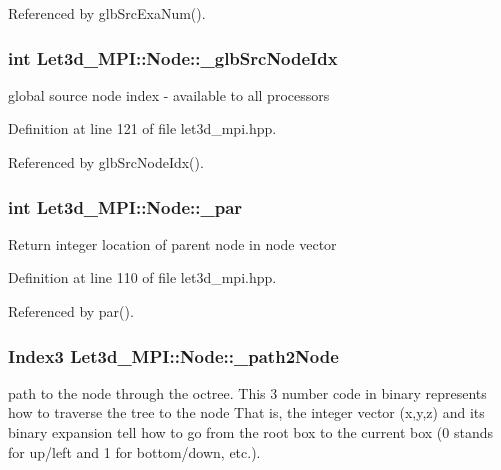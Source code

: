 Referenced by glb\-Src\-Exa\-Num().
\subsubsection{\setlength{\rightskip}{0pt plus 5cm}int {\bf Let3d\_\-MPI::Node::\_\-glb\-Src\-Node\-Idx}\hspace{0.3cm}{\tt  [protected]}}\label{classLet3d__MPI_1_1Node_cf27e8d726f505278c1e823e28422982_cf27e8d726f505278c1e823e28422982}


global source node index - available to all processors 

Definition at line 121 of file let3d\_\-mpi.hpp.

Referenced by glb\-Src\-Node\-Idx().
\subsubsection{\setlength{\rightskip}{0pt plus 5cm}int {\bf Let3d\_\-MPI::Node::\_\-par}\hspace{0.3cm}{\tt  [protected]}}\label{classLet3d__MPI_1_1Node_3e1a526b6a60598d99480dc7554b82fb_3e1a526b6a60598d99480dc7554b82fb}


Return integer location of parent node in node vector 

Definition at line 110 of file let3d\_\-mpi.hpp.

Referenced by par().
\subsubsection{\setlength{\rightskip}{0pt plus 5cm}Index3 {\bf Let3d\_\-MPI::Node::\_\-path2Node}\hspace{0.3cm}{\tt  [protected]}}\label{classLet3d__MPI_1_1Node_1105c752dee4c52564446e2f0d042664_1105c752dee4c52564446e2f0d042664}


path to the node through the octree. This 3 number code in binary represents how to traverse the tree to the node That is, the integer vector (x,y,z) and its binary expansion tell how to go from the root box to the current box (0 stands for up/left and 1 for bottom/down, etc.). 

